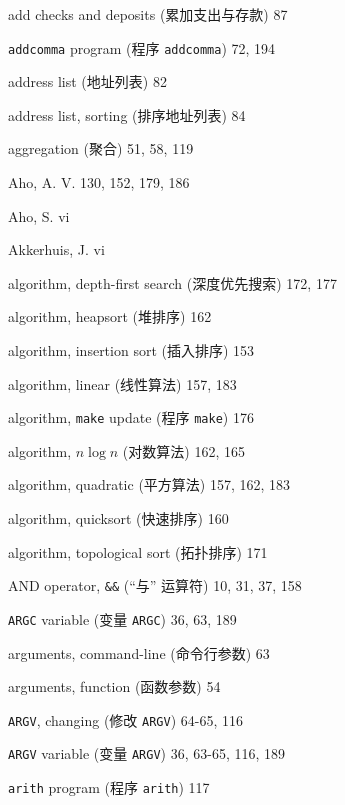 \begin{multicols}{3}
\hangindent=3pc  add checks and deposits (累加支出与存款) 87

\hangindent=3pc  \verb'addcomma' program (程序 \verb'addcomma') 72, 194

\hangindent=3pc  address list (地址列表) 82

\hangindent=3pc  address list, sorting (排序地址列表) 84

\hangindent=3pc  aggregation (聚合) 51, 58, 119

\hangindent=3pc  Aho, A. V. 130, 152, 179, 186

\hangindent=3pc  Aho, S. vi

\hangindent=3pc  Akkerhuis, J. vi

\hangindent=3pc  algorithm, depth-first search (深度优先搜索) 172, 177

\hangindent=3pc  algorithm, heapsort (堆排序) 162

\hangindent=3pc  algorithm, insertion sort (插入排序) 153

\hangindent=3pc  algorithm, linear (线性算法) 157, 183

\hangindent=3pc  algorithm, \verb'make' update (程序
\verb'make') 176

\hangindent=3pc  algorithm, $n\log n$ (对数算法) 162, 165

\hangindent=3pc  algorithm, quadratic (平方算法) 157, 162, 183

\hangindent=3pc  algorithm, quicksort (快速排序) 160

\hangindent=3pc  algorithm, topological sort (拓扑排序) 171

\hangindent=3pc  AND operator, \verb'&&' (``与'' 运算符) 10, 31, 37, 158

\hangindent=3pc  \verb'ARGC' variable (变量 \verb'ARGC') 36, 63, 189

\hangindent=3pc  arguments, command-line (命令行参数) 63

\hangindent=3pc  arguments, function (函数参数) 54

\hangindent=3pc  \verb'ARGV', changing (修改 \verb'ARGV') 64-65, 116

\hangindent=3pc  \verb'ARGV' variable (变量 \verb'ARGV') 36, 63-65, 116, 189

\hangindent=3pc  \verb'arith' program (程序 \verb'arith') 117


\end{multicols}
